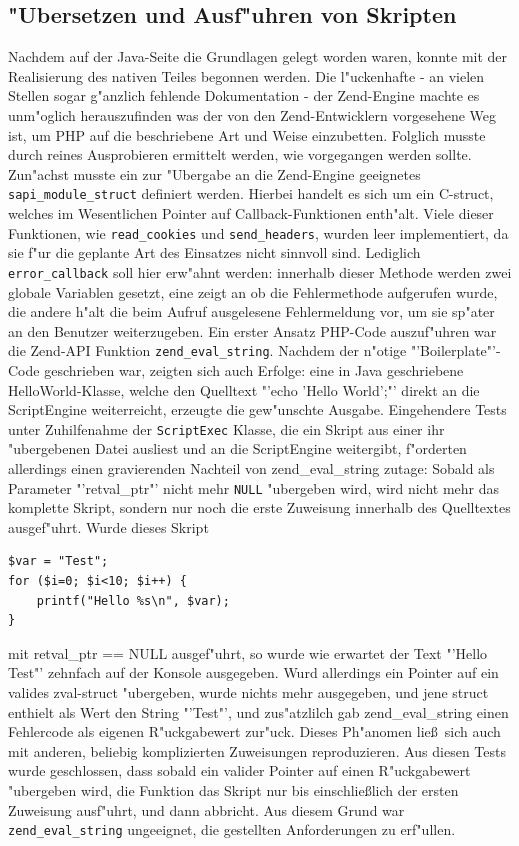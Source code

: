 \subsection{"Ubersetzen und Ausf"uhren von Skripten}
\label{sec:chap1:impl:2}

Nachdem auf der Java-Seite die Grundlagen gelegt worden waren, konnte mit der Realisierung des nativen Teiles begonnen werden.
Die l"uckenhafte - an vielen Stellen sogar g"anzlich fehlende Dokumentation - der Zend-Engine machte es unm"oglich
herauszufinden was der von den Zend-Entwicklern vorgesehene Weg ist, um PHP auf die beschriebene Art und Weise
einzubetten. Folglich musste durch reines Ausprobieren ermittelt werden, wie vorgegangen werden sollte.
Zun"achst musste ein zur "Ubergabe an die Zend-Engine geeignetes \texttt{sapi\_module\_struct} definiert werden.
Hierbei handelt es sich um ein C-struct, welches im Wesentlichen Pointer auf Callback-Funktionen enth"alt.
Viele dieser Funktionen, wie \texttt{read\_cookies} und \texttt{send\_headers}, wurden leer implementiert, da sie f"ur 
die geplante Art des Einsatzes nicht sinnvoll sind. Lediglich \texttt{error\_callback} soll hier erw"ahnt werden:
innerhalb dieser Methode werden zwei globale Variablen gesetzt, eine zeigt an ob die Fehlermethode aufgerufen wurde,
die andere h"alt die beim Aufruf ausgelesene Fehlermeldung vor, um sie sp"ater an den Benutzer weiterzugeben.
Ein erster Ansatz PHP-Code auszuf"uhren war die Zend-API Funktion \texttt{zend\_eval\_string}. Nachdem der n"otige
"'Boilerplate"'-Code geschrieben war, zeigten sich auch Erfolge: eine in Java geschriebene HelloWorld-Klasse, welche
den Quelltext "'echo 'Hello World';"' direkt an die ScriptEngine weiterreicht, erzeugte die gew"unschte Ausgabe.
Eingehendere Tests unter Zuhilfenahme der \texttt{ScriptExec} Klasse, die ein Skript aus einer ihr "ubergebenen Datei
ausliest und an die ScriptEngine weitergibt, f"orderten allerdings einen gravierenden Nachteil von zend\_eval\_string
zutage: Sobald als Parameter "'retval\_ptr"' nicht mehr \texttt{NULL} "ubergeben wird, wird nicht mehr das komplette
Skript, sondern nur noch die erste Zuweisung innerhalb des Quelltextes ausgef"uhrt. Wurde dieses Skript

\begin{lstlisting}[caption=Testscript f"ur zend\_eval\_string()]
$var = "Test";
for ($i=0; $i<10; $i++) {
    printf("Hello %s\n", $var);
}
\end{lstlisting}

mit retval\_ptr == NULL ausgef"uhrt, so wurde wie erwartet der Text "'Hello Test"' zehnfach auf der Konsole
ausgegeben. Wurd allerdings ein Pointer auf ein valides zval-struct "ubergeben, wurde nichts mehr ausgegeben,
und jene struct enthielt als Wert den String "'Test"', und zus"atzlilch gab zend\_eval\_string einen Fehlercode
als eigenen R"uckgabewert zur"uck. Dieses Ph"anomen lie\ss\ sich auch mit anderen, beliebig komplizierten Zuweisungen 
reproduzieren. Aus diesen Tests wurde geschlossen, dass sobald ein valider Pointer auf einen R"uckgabewert "ubergeben
wird, die Funktion das Skript nur bis einschlie\ss lich der ersten Zuweisung ausf"uhrt, und dann abbricht.
Aus diesem Grund war \texttt{zend\_eval\_string} ungeeignet, die gestellten Anforderungen zu erf"ullen.

